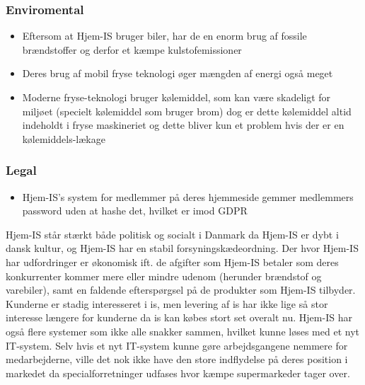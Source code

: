 \subsubsection{Enviromental}
\begin{itemize}
    \item Eftersom at Hjem-IS bruger biler, har de en enorm brug af fossile brændstoffer og derfor et kæmpe kulstofemissioner
    \item Deres brug af mobil fryse teknologi øger mængden af energi også meget
    \item Moderne fryse-teknologi bruger kølemiddel, som kan være skadeligt for miljøet (specielt kølemiddel som bruger brom) dog er dette kølemiddel altid indeholdt i fryse maskineriet og dette bliver kun et problem hvis der er en kølemiddels-lækage \cite{Benhadid2012refrigerants}
\end{itemize}
\subsubsection{Legal}
\begin{itemize}
    \item Hjem-IS’s system for medlemmer på deres hjemmeside gemmer medlemmers password uden at hashe det, hvilket er imod GDPR 
\end{itemize}

Hjem-IS står stærkt både politisk og socialt i Danmark da Hjem-IS er dybt i dansk kultur, og Hjem-IS har en stabil forsyningskædeordning. Der hvor Hjem-IS har udfordringer er økonomisk ift. de afgifter som Hjem-IS betaler som deres konkurrenter kommer mere eller mindre udenom (herunder brændstof og varebiler), samt en faldende efterspørgsel på de produkter som Hjem-IS tilbyder. Kunderne er stadig interesseret i is, men levering af is har ikke lige så stor interesse længere for kunderne da is kan købes stort set overalt nu. Hjem-IS har også flere systemer som ikke alle snakker sammen, hvilket kunne løses med et nyt IT-system. Selv hvis et nyt IT-system kunne gøre arbejdsgangene nemmere for medarbejderne, ville det nok ikke have den store indflydelse på deres position i markedet da specialforretninger udfases hvor kæmpe supermarkeder tager over.

